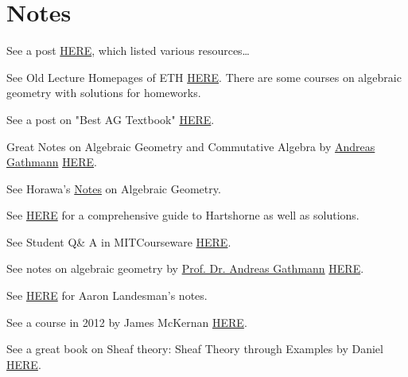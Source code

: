 \section{Notes}

See a post \href{https://math.stackexchange.com/questions/1678780/hartshorne-or-vakils-notes}{HERE}, which listed various resources\dots

See Old Lecture Homepages of ETH \href{https://www2.math.ethz.ch/education/bachelor/lectures.html}{HERE}. There are some courses on algebraic geometry with solutions for homeworks.

See a post on "Best AG Textbook" \href{https://math.stackexchange.com/questions/998/best-algebraic-geometry-text-book-other-than-hartshorne#:~:text=Before%20Hartshorne%27s%20book%20there%20was,and%20the%20sheaf%20of%20differentials.}{HERE}.

Great Notes on Algebraic Geometry and Commutative Algebra by \href{https://math.rptu.de/ags/agag/personen/leitung/gathmann/}{Andreas Gathmann} \href{https://agag-gathmann.math.rptu.de/de/notes.php}{HERE}.

See Horawa's \href{https://people.maths.ox.ac.uk/horawa/notes.html}{Notes} on Algebraic Geometry.

See \href{https://mathbooknotes.fandom.com/wiki/Hartshorne_-_Algebraic_Geometry}{HERE} for a comprehensive guide to Hartshorne as well as solutions.

See Student Q\& A in MITCourseware \href{https://ocw.mit.edu/courses/18-726-algebraic-geometry-spring-2009/pages/student-q-a/}{HERE}.

See notes on algebraic geometry by \href{https://math.rptu.de/en/wgs/agag/people/head/gathmann/}{Prof. Dr. Andreas Gathmann} \href{https://agag-gathmann.math.rptu.de/en/alggeom.php}{HERE}.


See \href{https://people.math.harvard.edu/~landesman/notes.html}{HERE} for Aaron Landesman's notes.

See a course in 2012 by James McKernan \href{https://math.mit.edu/~mckernan/Teaching/11-12/Spring/18.726/18.726.html}{HERE}.

See a great book on Sheaf theory: Sheaf Theory through Examples by Daniel \href{https://direct.mit.edu/books/oa-monograph/5460/Sheaf-Theory-through-Examples#}{HERE}.